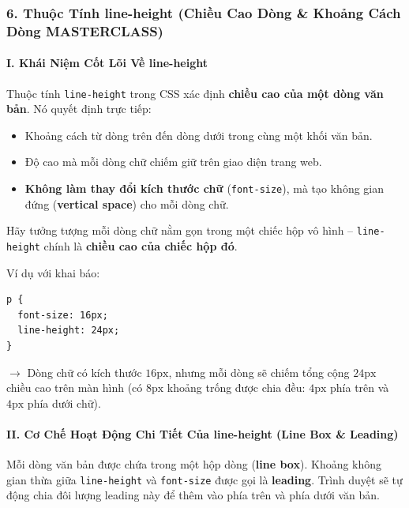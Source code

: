 \documentclass[11pt,oneside]{book}
\newcommand{\codeinline}[1]{\textcolor{accentOrange}{\texttt{#1}}}
\newcommand{\term}[1]{\textbf{\textcolor{primaryBlue}{#1}}}
\begin{document}
\subsubsection{6. Thuộc Tính line-height (Chiều Cao Dòng \& Khoảng Cách Dòng MASTERCLASS)}
\label{sec:line_height}

\paragraph*{I. Khái Niệm Cốt Lõi Về line-height}

Thuộc tính \codeinline{line-height} trong CSS xác định \textbf{chiều cao của một dòng văn bản}. Nó quyết định trực tiếp:
\begin{itemize}[leftmargin=1.5em, itemsep=3pt, parsep=0pt]
    \item Khoảng cách từ dòng trên đến dòng dưới trong cùng một khối văn bản.
    \item Độ cao mà mỗi dòng chữ chiếm giữ trên giao diện trang web.
    \item \textbf{Không làm thay đổi kích thước chữ} (\codeinline{font-size}), mà tạo không gian đứng (\term{vertical space}) cho mỗi dòng chữ.
\end{itemize}

\begin{conceptBox}
Hãy tưởng tượng mỗi dòng chữ nằm gọn trong một chiếc hộp vô hình -- \codeinline{line-height} chính là \textbf{chiều cao của chiếc hộp đó}.
\par\vspace{4pt}
Ví dụ với khai báo:
\begin{codeWindow}
\begin{lstlisting}[language=CSS3]
p {
  font-size: 16px;
  line-height: 24px;
}
\end{lstlisting}
\end{codeWindow}
$\rightarrow$ Dòng chữ có kích thước $16\text{px}$, nhưng mỗi dòng sẽ chiếm tổng cộng $24\text{px}$ chiều cao trên màn hình (có $8\text{px}$ khoảng trống được chia đều: $4\text{px}$ phía trên và $4\text{px}$ phía dưới chữ).
\end{conceptBox}

\paragraph*{II. Cơ Chế Hoạt Động Chi Tiết Của line-height (Line Box \& Leading)}

Mỗi dòng văn bản được chứa trong một hộp dòng (\term{line box}). Khoảng không gian thừa giữa \codeinline{line-height} và \codeinline{font-size} được gọi là \term{leading}. Trình duyệt sẽ tự động chia đôi lượng leading này để thêm vào phía trên và phía dưới văn bản.
\end{document}
